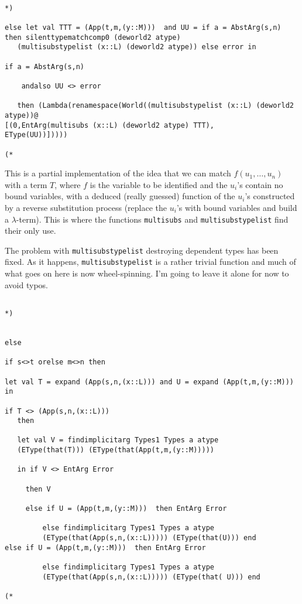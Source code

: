 \documentclass{article}
\begin{document}
\begin{verbatim}

*)

else let val TTT = (App(t,m,(y::M)))  and UU = if a = AbstArg(s,n) then silenttypematchcomp0 (deworld2 atype) 
   (multisubstypelist (x::L) (deworld2 atype)) else error in

if a = AbstArg(s,n) 

    andalso UU <> error 

   then (Lambda(renamespace(World((multisubstypelist (x::L) (deworld2 atype))@
[(0,EntArg(multisubs (x::L) (deworld2 atype) TTT),
EType(UU))]))))

(*

\end{verbatim}

This is a partial implementation of the idea that we can match $f(u_1,\ldots,u_n)$ with a term $T$, where $f$ is
the variable to be identified and the $u_i$'s contain no  bound variables, with a deduced (really guessed) function of the
$u_i$'s constructed by a reverse substitution process (replace the $u_i$'s with bound variables and build a $\lambda$-term).
This is where the functions {\tt multisubs} and {\tt multisubstypelist} find their only use.

The problem with {\tt multisubstypelist} destroying dependent types has been fixed.  As it happens, {\tt multisubstypelist} is
a rather trivial function and much of what goes on here is now wheel-spinning.  I'm going to leave it alone for now to avoid typos.

\begin{verbatim}

*)


else 

if s<>t orelse m<>n then 

let val T = expand (App(s,n,(x::L))) and U = expand (App(t,m,(y::M))) in

if T <> (App(s,n,(x::L))) 
   then 

   let val V = findimplicitarg Types1 Types a atype 
   (EType(that(T))) (EType(that(App(t,m,(y::M)))))

   in if V <> EntArg Error 

     then V

     else if U = (App(t,m,(y::M)))  then EntArg Error

         else findimplicitarg Types1 Types a atype 
         (EType(that(App(s,n,(x::L))))) (EType(that(U))) end 
else if U = (App(t,m,(y::M)))  then EntArg Error

         else findimplicitarg Types1 Types a atype 
         (EType(that(App(s,n,(x::L))))) (EType(that( U))) end

(*

\end{verbatim}
\end{document}
